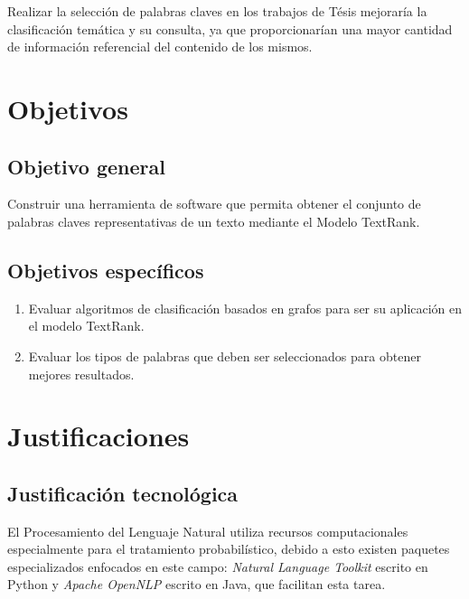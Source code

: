 Realizar la selecci\'on de palabras claves en los trabajos de T\'esis mejorar\'ia la
clasificaci\'on tem\'atica y su consulta, ya que proporcionar\'ian una mayor cantidad
de informaci\'on referencial del contenido de los mismos.




\section{Objetivos}

\subsection{Objetivo general}
Construir una herramienta de software que permita obtener el conjunto de palabras claves
representativas de un texto mediante el Modelo TextRank.

\subsection{Objetivos espec\'ificos}
\begin{enumerate}
	\item Evaluar algoritmos de clasificaci\'on basados en grafos para ser su
	aplicaci\'on en el modelo TextRank.
	\item Evaluar los tipos de palabras que deben ser seleccionados para obtener mejores
	resultados.
\end{enumerate}

\section{Justificaciones}
\subsection{Justificaci\'on tecnol\'ogica}
El Procesamiento del Lenguaje Natural utiliza recursos computacionales especialmente
para el tratamiento probabil\'istico, debido a esto existen paquetes especializados
enfocados en este campo: \emph{Natural Language Toolkit} escrito en Python y
\emph{Apache OpenNLP} escrito en Java, que facilitan esta tarea.

